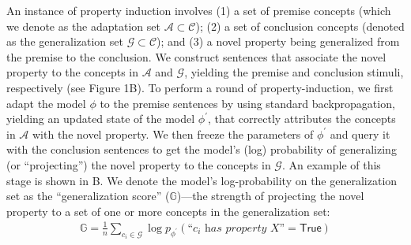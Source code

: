\documentclass[10pt,letterpaper]{article}
\newcommand{\km}[1]{\textcolor{purple}{$_{KM}$[#1]}}
\newcommand{\adaptation}{\mathcal{A}}
\newcommand{\generalization}{\mathcal{G}}
\newcommand{\concepts}{\mathcal{C}}
\newcommand{\true}{\mathsf{True}}
\newcounter{argument}
\begin{document}
An instance of property induction involves (1) a set of premise concepts (which we denote as the adaptation set $\adaptation \subset \concepts$); (2) a set of conclusion concepts (denoted as the generalization set $\generalization \subset \concepts$); and (3) a novel property being generalized from the premise to the conclusion.
We construct sentences that associate the novel property to the concepts in $\adaptation$ and $\generalization$, yielding the premise and conclusion stimuli, respectively (see Figure 1B).
To perform a round of property-induction, we first adapt the model $\phi$ to the premise sentences by using standard backpropagation, yielding an updated state of the model $\phi^{\prime}$, that correctly attributes the concepts in $\adaptation$ with the novel property.
We then freeze the parameters of $\phi^{\prime}$ and query it with the conclusion sentences to get the model's (log) probability of generalizing (or ``projecting'') the novel property to the concepts in $\generalization$.
An example of this stage is shown in B.
We denote the model's log-probability on the generalization set as the ``generalization score'' ($\mathbb{G}$)---the strength of projecting the novel property to a set of one or more concepts in the generalization set:
\begin{align}
    \mathbb{G} = \frac{1}{n}\sum_{\textit{c}_i \in \mathcal{G}} \log p_{\phi^{\prime}}(\textit{``c}_i\textit{ has property X''} = \true)\label{eq:genscore}
\end{align}
\end{document}
